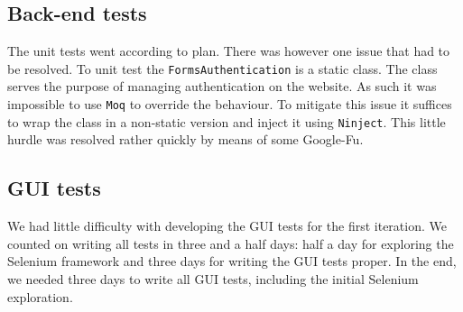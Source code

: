 \documentclass[10pt,a4paper,BCOR12mm, headexclude, footexclude,
  twoside, openright]{scrartcl}
\numberwithin{equation}{section} %
\numberwithin{figure}{section} %
\numberwithin{table}{section} %
\begin{document}
\subsection{Back-end tests}
The unit tests went according to plan. There was however one issue that had to
be resolved. To unit test the \texttt{FormsAuthentication} is a static
class. The class serves the purpose of managing authentication on the
website. As such it was impossible to use \texttt{Moq} to override the
behaviour. To mitigate this issue it suffices to wrap the class in a non-static
version and inject it using \texttt{Ninject}. This little hurdle was resolved
rather quickly by means of some Google-Fu.

\subsection{GUI tests}
We had little difficulty with developing the GUI tests for the first iteration. We counted on writing all tests in three and a half days: half a day for exploring the Selenium framework and three days for writing the GUI tests proper.
In the end, we needed three days to write all GUI tests, including the initial Selenium exploration.
\end{document}
